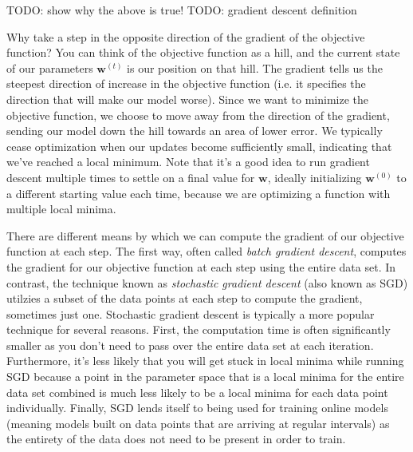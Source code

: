 TODO: show why the above is true!
TODO: gradient descent definition

Why take a step in the opposite direction of the gradient of the objective function? You can think of the objective function as a hill, and the current state of our parameters $\textbf{w}^{(t)}$ is our position on that hill. The gradient tells us the steepest direction of increase in the objective function (i.e. it specifies the direction that will make our model worse). Since we want to minimize the objective function, we choose to move away from the direction of the gradient, sending our model down the hill towards an area of lower error. We typically cease optimization when our updates become sufficiently small, indicating that we've reached a local minimum. Note that it's a good idea to run gradient descent multiple times to settle on a final value for $\textbf{w}$, ideally initializing $\textbf{w}^{(0)}$ to a different starting value each time, because we are optimizing a function with multiple local minima.

There are different means by which we can compute the gradient of our objective function at each step. The first way, often called \textit{batch gradient descent}, computes the gradient for our objective function at each step using the entire data set. In contrast, the technique known as \textit{stochastic gradient descent} (also known as SGD) utilzies a subset of the data points at each step to compute the gradient, sometimes just one. Stochastic gradient descent is typically a more popular technique for several reasons. First, the computation time is often significantly smaller as you don't need to pass over the entire data set at each iteration. Furthermore, it's less likely that you will get stuck in local minima while running SGD because a point in the parameter space that is a local minima for the entire data set combined is much less likely to be a local minima for each data point individually. Finally, SGD lends itself to being used for training online models (meaning models built on data points that are arriving at regular intervals) as the entirety of the data does not need to be present in order to train.


